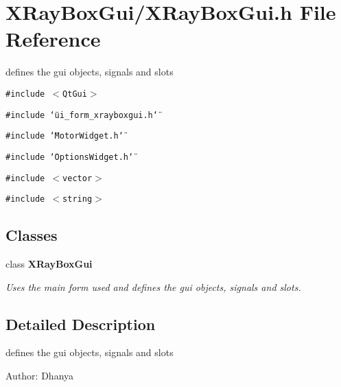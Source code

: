 \section{XRay\-Box\-Gui/XRay\-Box\-Gui.h File Reference}
\label{XRayBoxGui_8h}
defines the gui objects, signals and slots 

{\tt \#include $<$Qt\-Gui$>$}\par
{\tt \#include \char`\"{}ui\_\-form\_\-xrayboxgui.h\char`\"{}}\par
{\tt \#include \char`\"{}Motor\-Widget.h\char`\"{}}\par
{\tt \#include \char`\"{}Options\-Widget.h\char`\"{}}\par
{\tt \#include $<$vector$>$}\par
{\tt \#include $<$string$>$}\par
\subsection*{Classes}
\begin{CompactItemize}
\item 
class \bf{XRay\-Box\-Gui}
\begin{CompactList}\small\item\em Uses the main form used and defines the gui objects, signals and slots. \item\end{CompactList}\end{CompactItemize}


\subsection{Detailed Description}
defines the gui objects, signals and slots 

\begin{Desc}
\item[Author:]Dhanya \end{Desc}
